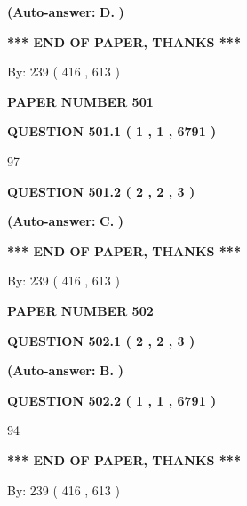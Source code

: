\documentclass[12pt]{article}
\begin{document}
 
{\textbf{(Auto-answer:}}
{\textbf{\large{
D.}}}
{\textbf{)}}
 
 
   
   
   
   
\vspace{1.0in} 
{\textbf{\large{ *** END OF PAPER, THANKS *** }}} 
   
   
\hspace{1.0in} By: 
 239 ( 416 ,  613 )
   
   
   
   
\newpage 
\setcounter{page}{ 
   501001 } 
   
   
 {\textbf{ \Large{ PAPER NUMBER  501  }}}
   
   
   
   
  
  
{\textbf{\large{QUESTION
501.1 
 ( 1 , 1 , 6791 )
}}}

97
  
  
{\textbf{\large{QUESTION
501.2 
 ( 2 , 2 , 3 )
}}}
 
 
{\textbf{(Auto-answer:}}
{\textbf{\large{
C.}}}
{\textbf{)}}
 
 
   
   
   
   
\vspace{1.0in} 
{\textbf{\large{ *** END OF PAPER, THANKS *** }}} 
   
   
\hspace{1.0in} By: 
 239 ( 416 ,  613 )
   
   
   
   
\newpage 
\setcounter{page}{ 
   502001 } 
   
   
 {\textbf{ \Large{ PAPER NUMBER  502  }}}
   
   
   
   
  
  
{\textbf{\large{QUESTION
502.1 
 ( 2 , 2 , 3 )
}}}
 
 
{\textbf{(Auto-answer:}}
{\textbf{\large{
B.}}}
{\textbf{)}}
 
 
  
  
{\textbf{\large{QUESTION
502.2 
 ( 1 , 1 , 6791 )
}}}

94
   
   
   
   
\vspace{1.0in} 
{\textbf{\large{ *** END OF PAPER, THANKS *** }}} 
   
   
\hspace{1.0in} By: 
 239 ( 416 ,  613 )
   
   
   
\end{document}
